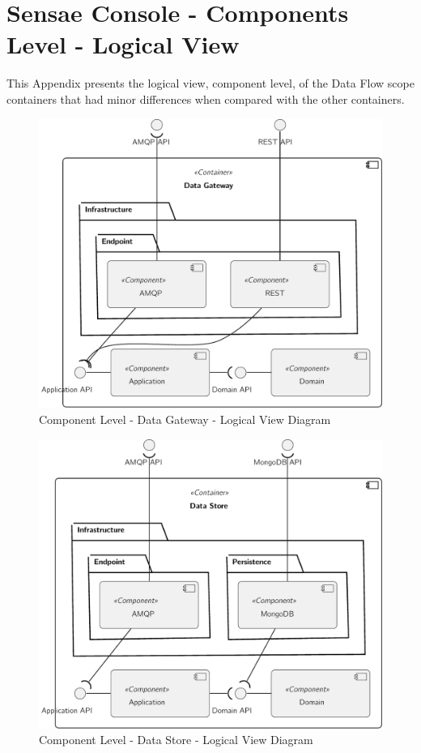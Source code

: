 \chapter{Sensae Console - Components Level - Logical View}
\label{AppendixC}

This Appendix presents the logical view, component level, of the Data Flow scope containers that had minor differences when compared with the other containers.

\begin{figure}[H]
   \centering
   \includegraphics[page=1,width=0.6\columnwidth]{assets/diagrams/design/architectural/level3/logical/data-gateway.pdf}
   \caption[Component Level - Data Gateway - Logical View Diagram]{Component Level - Data Gateway - Logical View Diagram}
   \label{fig:AppendixC:gateway}
\end{figure}

\begin{figure}[H]
   \centering
   \includegraphics[page=1,width=0.6\columnwidth]{assets/diagrams/design/architectural/level3/logical/data-store.pdf}
   \caption[Component Level - Data Store - Logical View Diagram]{Component Level - Data Store - Logical View Diagram}
   \label{fig:AppendixC:store}
\end{figure}


